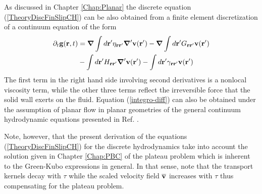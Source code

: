\documentclass[b5paper,openright,10pt]{book}
\begin{document}
As  discussed  in Chapter \ref{Chap:Planar}
the discrete equation (\ref{TheoryDiscFinSlipCH})  can be also obtained from
a finite element discretization of a continuum equation of the form
\begin{align}
  \partial_t{\bf g}({\bf r},t)&=\boldsymbol{\nabla}\int d{\bf r}'
\eta_{{\bf r}{\bf r}'}\boldsymbol{\nabla}'{\bf v}({\bf r}')
-\boldsymbol{\nabla}\int d{\bf r}'
G_{{\bf r}{\bf r}'}{\bf v}({\bf r}')
\nonumber\\
&-\int d{\bf r}'H_{{\bf r}{\bf r}'}\boldsymbol{\nabla}'{\bf v}({\bf r}')
-\int d{\bf r}'
\gamma_{{\bf r}{\bf r}'}{\bf v}({\bf r}')
\label{integro-diff}
\end{align}
The first term in the right  hand side involving second derivatives is
a nonlocal  viscosity term, while  the other three terms  reflect the
irreversible   force    that   the   solid   wall    exerts   on   the
fluid.  Equation  (\ref{integro-diff})  can  also  be  obtained  under  the
assumption  of  planar  flow  in  planar  geometries  of  the  general
continuum hydrodynamic equations presented in Ref. \cite{CamargoBC2018}.

Note, however, that the   present  derivation  of   the  equations
(\ref{TheoryDiscFinSlipCH}) for the discrete hydrodynamics take into account
the solution  given in Chapter \ref{Chap:PBC} of the plateau problem  which is
inherent to  the Green-Kubo  expressions in  general.  In  that sense,
note that  the transport  kernels decay with  $\tau$ while  the scaled
velocity  field   $\overline{\bf  v}$   increases  with   $\tau$  thus
compensating for the plateau problem.
\end{document}
